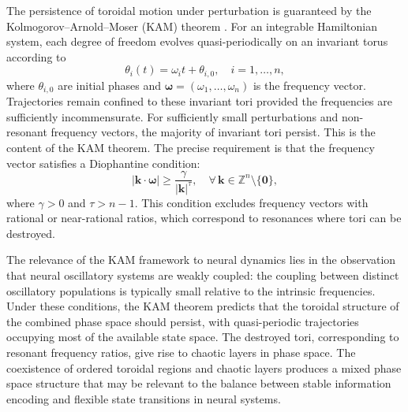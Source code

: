\documentclass[12pt,a4paper]{article}
\makeatletter
\let\orig@section\section
\renewcommand{\section}{\@ifstar{\orig@section*}{\@dblarg{\my@section}}}
\def\my@section[#1]#2{\orig@section[#1]{#2}\noindent\@afterindentfalse\@afterheading}
\makeatother
\begin{document}
\section{KAM Theory and Invariant Tori}\label{sec:kam}

The persistence of toroidal motion under perturbation is guaranteed by the Kolmogorov--Arnold--Moser (KAM) theorem \cite{Kolmogorov1954, Arnold1963, Moser1962}.
For an integrable Hamiltonian system, each degree of freedom evolves quasi-periodically on an invariant torus according to
\begin{equation}\label{eq:quasiperiodic}
  \theta_i(t) = \omega_i t + \theta_{i,0}, \quad i = 1, \ldots, n,
\end{equation}
where $\theta_{i,0}$ are initial phases and $\bm{\omega} = (\omega_1, \ldots, \omega_n)$ is the frequency vector.
Trajectories remain confined to these invariant tori provided the frequencies are sufficiently incommensurate.
For sufficiently small perturbations and non-resonant frequency vectors, the majority of invariant tori persist. This is the content of the KAM theorem. The precise requirement is that the frequency vector satisfies a Diophantine condition:
\begin{equation}\label{eq:diophantine}
  |\bm{k} \cdot \bm{\omega}| \geq \frac{\gamma}{|\bm{k}|^\tau}, \quad \forall\, \bm{k} \in \mathbb{Z}^n \setminus \{\bm{0}\},
\end{equation}
where $\gamma > 0$ and $\tau > n - 1$.
This condition excludes frequency vectors with rational or near-rational ratios, which correspond to resonances where tori can be destroyed.

The relevance of the KAM framework to neural dynamics lies in the observation that neural oscillatory systems are weakly coupled: the coupling between distinct oscillatory populations is typically small relative to the intrinsic frequencies.
Under these conditions, the KAM theorem predicts that the toroidal structure of the combined phase space should persist, with quasi-periodic trajectories occupying most of the available state space.
The destroyed tori, corresponding to resonant frequency ratios, give rise to chaotic layers in phase space.
The coexistence of ordered toroidal regions and chaotic layers produces a mixed phase space structure that may be relevant to the balance between stable information encoding and flexible state transitions in neural systems.
\end{document}
